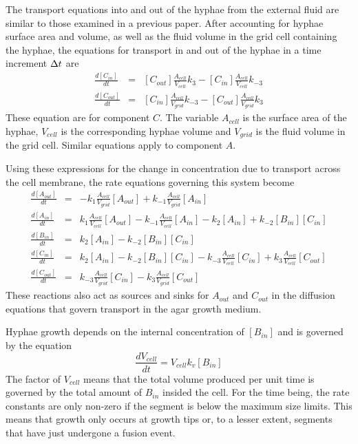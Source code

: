 \documentclass[12pt]{article}
\begin{document}
The transport equations into and out of the hyphae from the external fluid are similar to those
examined in a previous paper.
After accounting for hyphae surface area and volume, as well as the fluid volume in the grid cell
containing the hyphae, the equations for transport in and out of the hyphae in a time increment
$\Delta t$ are
\begin{eqnarray*}
\frac{d [C_{in}]}{dt} &=& [C_{out}]\frac{A_{cell}}{V_{cell}}k_3 - [C_{in}]\frac{A_{cell}}{V_{cell}}
k_{-3} \\
\frac{d[C_{out}]}{dt} &=& [C_{in}]\frac{A_{cell}}{V_{grid}}k_{-3} - [C_{out}]\frac{A_{cell}}{V_{grid}}
k_{3}
\end{eqnarray*}
These equation are for component $C$. The variable $A_{cell}$ is the surface area of the hyphae,
$V_{cell}$ is the corresponding hyphae volume and $V_{grid}$ is the fluid volume in the grid cell.
Similar equations apply to component $A$.

Using these expressions for the change in concentration due to transport across the cell membrane, the
rate equations governing this system become
\begin{eqnarray*}
\frac{d [A_{out}]}{d t} &=&-k_1\frac{A_{cell}}{V_{grid}} [A_{out}]
+k_{-1}\frac{A_{cell}}{V_{grid}} [A_{in}] \\
\frac{d [A_{in}]}{d t} &=&k_1\frac{A_{cell}}{V_{cell}} [A_{out}]
-k_{-1}\frac{A_{cell}}{V_{cell}} [A_{in}] - k_2 [A_{in}]
 + k_{-2}[B_{in}][C_{in}]\\
\frac{d [B_{in}]}{d t} &=&k_2 [A_{in}] - k_{-2}[B_{in}][C_{in}]\\
\frac{d [C_{in}]}{d t} &=&k_2 [A_{in}] - k_{-2}[B_{in}][C_{in}]
-k_{-3} \frac{A_{cell}}{V_{cell}}[C_{in}]
+ k_3\frac{A_{cell}}{V_{cell}} [C_{out}] \\
\frac{d [C_{out}]}{d t} &=&k_{-3} \frac{A_{cell}}{V_{grid}}[C_{in}]
-k_3\frac{A_{cell}}{V_{grid}} [C_{out}]
\end{eqnarray*}
These reactions also act as sources and sinks for $A_{out}$ and $C_{out}$ in the diffusion
equations that govern transport in the agar growth medium.

Hyphae growth depends on the internal concentration of $[B_{in}]$ and is governed by the equation
\[
\frac{dV_{cell}}{dt} = V_{cell}k_v[B_{in}]
\]
The factor of $V_{cell}$ means that the total volume produced per unit time is
governed by the total amount of $B_{in}$ insided the cell. For the time being,
the rate constants are only non-zero if the segment is below the maximum size
limits. This means that growth only occurs at growth tips or, to a lesser
extent, segments that have just undergone a fusion event.
\end{document}
